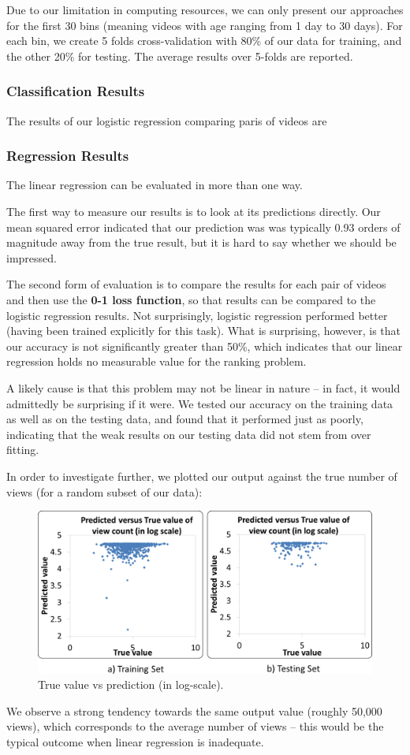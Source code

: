 Due to our limitation in computing resources, we can only present our approaches for the first 30 bins (meaning videos with age ranging from 1 day to 30 days). For each bin, we create 5 folds cross-validation with 80\% of our data for training, and the other 20\% for testing. The average results over 5-folds are reported.

\subsubsection{Classification Results}
	The results of our logistic regression comparing paris of videos are
	
	
\subsubsection{Regression Results}
	The linear regression can be evaluated in more than one way.
	
	The first way to measure our results is to look at its predictions directly.  Our mean squared error indicated that our prediction was was typically 0.93 orders of magnitude away from the true result, but it is hard to say whether we should be impressed.
	
	The second form of evaluation is to compare the results for each pair of videos and then use the \textbf{0-1 loss function}, so that results can be compared to the logistic regression results.  Not surprisingly, logistic regression performed better (having been trained explicitly for this task).  What is surprising, however, is that our accuracy is not significantly greater than 50\%, which indicates that our linear regression holds no measurable value for the ranking problem.
	
	A likely cause is that this problem may not be linear in nature -- in fact, it would admittedly be surprising if it were.  We tested our accuracy on the training data as well as on the testing data, and found that it performed just as poorly, indicating that the weak results on our testing data did not stem from over fitting.
	
	In order to investigate further, we plotted our output against the true number of views (for a random subset of our data):

	\begin{figure}[!h]
		\begin{center}
			\includegraphics[width=.75\textwidth,clip]{regression.pdf}
		\end{center}
		\caption{True value vs prediction (in log-scale).}
		\label{fig:trainingTrueVsPredicted}
	\end{figure}
		
	We observe a strong tendency towards the same output value (roughly 50,000 views), which corresponds to the average number of views -- this would be the typical outcome when linear regression is inadequate.
